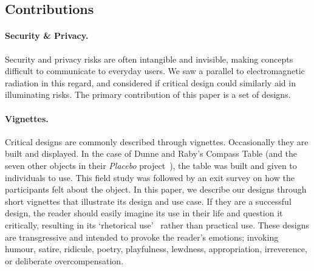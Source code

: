 %
%

\subsection{Contributions}

\paragraph{Security \& Privacy.} Security and privacy risks are often intangible and invisible, making concepts difficult to communicate to everyday users. We saw a parallel to electromagnetic radiation in this regard, and considered if critical design could similarly aid in illuminating risks. The primary contribution of this paper is a set of designs.

\paragraph{Vignettes.} Critical designs are commonly described through vignettes. Occasionally they are built and displayed. In the case of Dunne and Raby's Compass Table (and the seven other objects in their \textit{Placebo} project~\cite{DuRa01}), the table was built and given to individuals to use. This field study was followed by an exit survey on how the participants felt about the object. In this paper, we describe our designs through short vignettes that illustrate its design and use case. If they are a successful design, the reader should easily imagine its use in their life and question it critically, resulting in its `rhetorical use'~\cite{Mal17} rather than practical use. These designs are transgressive and intended to provoke the reader's emotions; invoking humour, satire, ridicule, poetry, playfulness, lewdness, appropriation, irreverence, or deliberate overcompensation.


